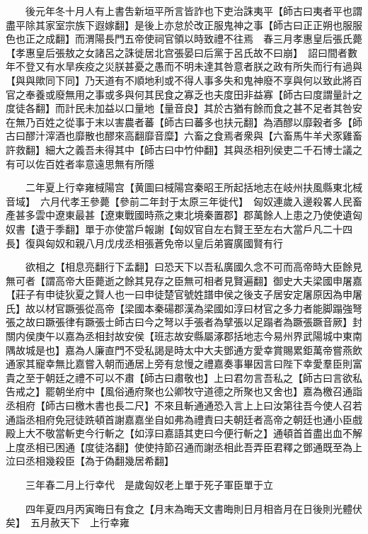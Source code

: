 　　後元年冬十月人有上書吿新垣平所言皆詐也下吏治誅夷平【師古曰夷者平也謂盡平除其家室宗族下遐嫁翻】是後上亦怠於改正服鬼神之事【師古曰正正朔也服服色也正之成翻】而渭陽長門五帝使祠官領以時致禮不往焉　春三月孝惠皇后張氏薨【孝惠皇后張敖之女諸呂之誅徙居北宫張晏曰后黨于呂氏故不曰崩】　詔曰間者數年不登又有水旱疾疫之災朕甚憂之愚而不明未達其咎意者朕之政有所失而行有過與【與與歟同下同】乃天道有不順地利或不得人事多失和鬼神廢不享與何以致此將百官之奉養或廢無用之事或多與何其民食之寡乏也夫度田非益寡【師古曰度謂量計之度徒各翻】而計民未加益以口量地【量音良】其於古猶有餘而食之甚不足者其咎安在無乃百姓之從事于末以害農者蕃【師古曰蕃多也扶元翻】為酒醪以靡穀者多【師古曰醪汁滓酒也靡散也醪來高翻靡音糜】六畜之食焉者衆與【六畜馬牛羊犬豕雞畜許救翻】細大之義吾未得其中【師古曰中竹仲翻】其與丞相列侯吏二千石博士議之有可以佐百姓者率意遠思無有所隱

　　二年夏上行幸雍棫陽宫【黄圖曰棫陽宫秦昭王所起括地志在岐州扶風縣東北棫音域】　六月代孝王參薨【參前二年封于太原三年徙代】　匈奴連歲入邊殺畧人民畜產甚多雲中遼東最甚【遼東戰國時燕之東北境秦置郡】郡萬餘人上患之乃使使遺匈奴書【遺于季翻】單于亦使當戶報謝【匈奴官自左右賢王至左右大當戶凡二十四長】復與匈奴和親八月戊戌丞相張蒼免帝以皇后弟竇廣國賢有行

　　欲相之【相息亮翻行下孟翻】曰恐天下以吾私廣國久念不可而高帝時大臣餘見無可者【謂高帝大臣薨逝之餘其見存之臣無可相者見賢遍翻】御史大夫梁國申屠嘉【莊子有申徒狄夏之賢人也一曰申徒楚官號姓譜申侯之後支子居安定屠原因為申屠氏】故以材官蹶張從高帝【梁國本秦碭郡漢為梁國如淳曰材官之多力者能脚蹋強弩張之故曰蹶張律有蹶張士師古曰今之弩以手張者為擘張以足蹋者為蹶張蹶音厥】封關内侯庚午以嘉為丞相封故安侯【班志故安縣屬涿郡括地志今易州界武陽城中東南隅故城是也】嘉為人廉直門不受私謁是時太中大夫鄧通方愛幸賞賜累鉅萬帝嘗燕飲通家其寵幸無比嘉嘗入朝而通居上旁有怠慢之禮嘉奏事畢因言曰陛下幸愛羣臣則富貴之至于朝廷之禮不可以不肅【師古曰肅敬也】上曰君勿言吾私之【師古曰言欲私告戒之】罷朝坐府中【風俗通府聚也公卿牧守道德之所聚也又舍也】嘉為檄召通詣丞相府【師古曰檄木書也長二尺】不來且斬通通恐入言上上曰汝第往吾今使人召若通詣丞相府免冠徒跣頓首謝嘉嘉坐自如弗為禮責曰夫朝廷者高帝之朝廷也通小臣戲殿上大不敬當斬吏今行斬之【如淳曰嘉語其吏曰今便行斬之】通頓首首盡出血不解上度丞相已困通【度徒洛翻】使使持節召通而謝丞相此吾弄臣君釋之鄧通既至為上泣曰丞相幾殺臣【為于偽翻幾居希翻】

　　三年春二月上行幸代　是歲匈奴老上單于死子軍臣單于立

　　四年夏四月丙寅晦日有食之【月末為晦天文書晦則日月相沓月在日後則光體伏矣】　五月赦天下　上行幸雍

